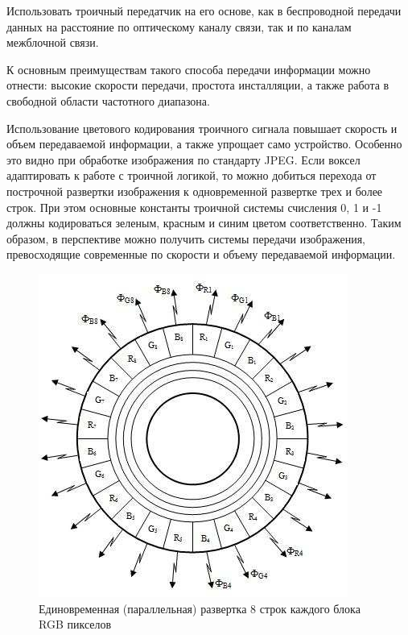\documentclass[10pt]{beamer}
\begin{document}
\begin{frame}[shrink=20,fragile]
\transdissolve[duration=0.2]
\begin{block}{}
	 Использовать троичный передатчик на его основе, как в беспроводной передачи данных на расстояние по оптическому каналу связи, так и по каналам межблочной связи.
	
	К основным преимуществам такого способа передачи информации можно отнести: высокие скорости передачи, простота инсталляции, а также работа в свободной области частотного диапазона.
	
	Использование цветового кодирования троичного сигнала повышает скорость и объем передаваемой информации, а также упрощает само устройство. Особенно это видно при обработке изображения по стандарту JPEG. Если воксел адаптировать к работе с троичной логикой, то можно добиться перехода от построчной развертки изображения к одновременной развертке трех и более строк. При этом основные константы троичной системы счисления 0, 1 и -1 должны кодироваться зеленым, красным и синим цветом соответственно. Таким образом, в перспективе можно получить системы передачи изображения, превосходящие современные по скорости и объему передаваемой информации.
	\begin{figure}
	\label{fig6}
	\includegraphics[scale=0.85]{pics/5.jpeg}
	\caption{Единовременная (параллельная) развертка 8 строк каждого блока RGB пикселов}
	\end{figure}
\end{block}   
\end{frame}
\end{document}
